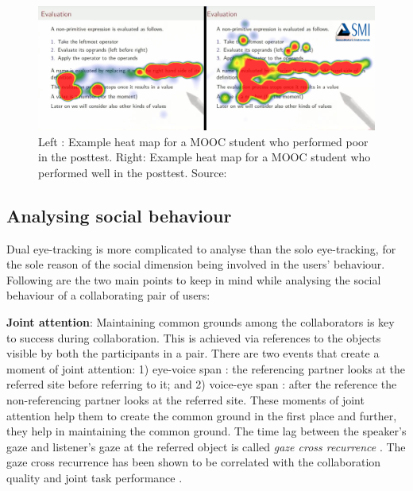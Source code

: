 \documentclass{sig-alternate}
\begin{document}
\begin{figure}
    \centering
    \includegraphics[width=\linewidth]{heat-map}
    \caption{Left : Example heat map for a MOOC student who performed poor in the posttest. Right: Example heat map for a MOOC student who performed well in the posttest. Source: \cite{sharma2014how}}
    \label{heatMap}
\end{figure}





\subsection{Analysing social behaviour}

Dual eye-tracking is more complicated to analyse than the solo eye-tracking, for the sole reason of the social dimension being involved in the users' behaviour. Following are the two main points to keep in mind while analysing the social behaviour of a collaborating pair of users: 



 \textbf {Joint attention}: Maintaining common grounds among the collaborators is key to success during collaboration. This is achieved via references to the objects visible by both the participants in a pair. There are two events that create a moment of joint attention: 1) eye-voice span \cite{griffin2000eyes}: the referencing partner looks at the referred site before referring to it; and 2) voice-eye span \cite{allopenna1998tracking}: after the reference the non-referencing partner looks at the referred site. These moments of joint attention help them to create the common ground in the first place and further, they help in maintaining the common ground. The time lag between the speaker's gaze and listener's gaze at the referred object is called \emph{gaze cross recurrence} \cite{richardson2007art}. The gaze cross recurrence has been shown to be correlated with the collaboration quality and joint task performance \cite{nussli2011dual}.
\end{document}
